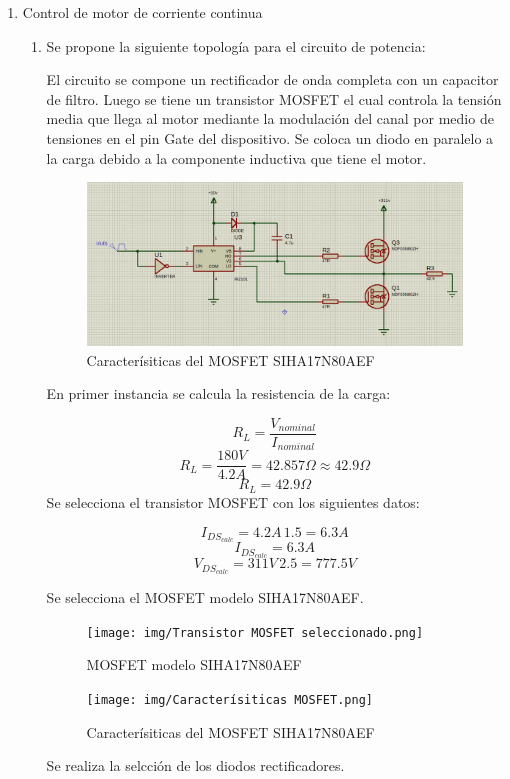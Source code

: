 \documentclass{article}
\begin{document}
\begin{enumerate}
    \item Control de motor de corriente continua
\begin{enumerate}[label=\alph*.]
    \item Se propone la siguiente topología para el circuito de potencia:




El circuito se compone un rectificador de onda completa con un capacitor de filtro. Luego se tiene un transistor MOSFET el cual controla la tensión media que llega al motor mediante la modulación del canal por medio de tensiones en el pin Gate del dispositivo. 
Se coloca un diodo en paralelo a la carga debido a la componente inductiva que tiene el motor.

\begin{figure}[h!]
    \centering
    \includegraphics[width=0.6\linewidth]{img/Circuito para motor CC.png}
    \caption{Caracterísiticas del MOSFET SIHA17N80AEF}
    \label{fig:esquematico}
\end{figure}




En primer instancia se calcula la resistencia de la carga:

$$ \boxed{ R_{L}= \frac{V_{nominal}}{I_{nominal}} } $$
$$ R_{L}= \frac{180V}{4.2A}= 42.857 \Omega \approx 42.9 \Omega $$
$$ \boxed{ R_{L}= 42.9 \Omega } $$
Se selecciona el transistor MOSFET con los siguientes datos:

$$ I_{DS_{calc}}= 4.2A \, 1.5= 6.3A $$
$$ \boxed{ I_{DS_{calc}}= 6.3A } $$
$$ V_{DS_{calc}}= 311V \, 2.5= 777.5V $$

Se selecciona el MOSFET modelo SIHA17N80AEF.

\begin{figure}[h!]
    \centering
    \texttt{[image: img/Transistor MOSFET seleccionado.png]}
    \caption{MOSFET modelo SIHA17N80AEF}
    \label{fig:esquematico}
\end{figure}
\begin{figure}[h!]
    \centering
    \texttt{[image: img/Caracterísiticas MOSFET.png]}
    \caption{Caracterísiticas del MOSFET SIHA17N80AEF}
    \label{fig:esquematico}
\end{figure}
Se realiza la selcción de los diodos rectificadores.


\end{enumerate}
\end{enumerate}
\end{document}
